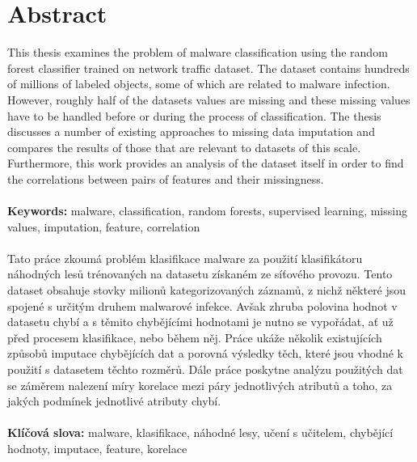 \documentclass[11pt]{article}
\begin{document}
  \section*{Abstract}
    \thispagestyle{empty}
    This thesis examines the problem of malware classification using the random forest classifier trained on network traffic dataset. The dataset contains hundreds of millions of labeled objects, some of which are related to malware infection. However, roughly half of the datasets values are missing and these missing values have to be handled before or during the process of classification. The thesis discusses a number of existing approaches to missing data imputation and compares the results of those that are relevant to datasets of this scale. Furthermore, this work provides an analysis of the dataset itself in order to find the correlations between pairs of features and their missingness.
    \\~\\
    {\bf Keywords:} malware, classification, random forests, supervised learning, missing values, imputation, feature, correlation 
    \\~\\
    Tato práce zkoumá problém klasifikace malware za použití klasifikátoru náhodných lesů trénovaných na datasetu získaném ze síťového provozu. Tento dataset obsahuje stovky milionů kategorizovaných záznamů, z nichž některé jsou spojené s určitým druhem malwarové infekce. Avšak zhruba polovina hodnot v datasetu chybí a s těmito chybějícími hodnotami je nutno se vypořádat, ať už před procesem klasifikace, nebo během něj. Práce ukáže několik existujících způsobů imputace chybějících dat a porovná výsledky těch, které jsou vhodné k použití s datasetem těchto rozměrů. Dále práce poskytne analýzu použitých dat se záměrem nalezení míry korelace mezi páry jednotlivých atributů a toho, za jakých podmínek jednotlivé atributy chybí.
    \\~\\
    {\bf Klíčová slova:} malware, klasifikace, náhodné lesy, učení s učitelem, chybějící hodnoty, imputace, feature, korelace
  \newpage
  {\hypersetup{hidelinks}
  \thispagestyle{empty}
  \tableofcontents
  \thispagestyle{empty}
  \newpage
  \thispagestyle{empty}
  \listoffigures
  \listoftables}
  \newpage
\end{document}
